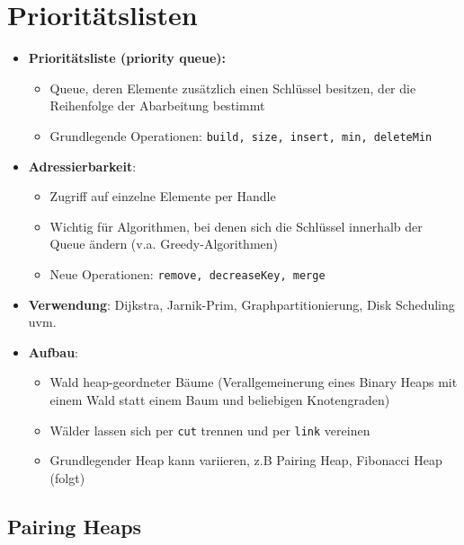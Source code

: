 \section{Prioritätslisten}%
\label{pl:sec:prioritaetslisten}

\begin{itemize}
	\item \textbf{Prioritätsliste (priority queue):}
	\begin{itemize}
		\item Queue, deren Elemente zusätzlich einen Schlüssel besitzen, der die Reihenfolge der Abarbeitung bestimmt
		\item Grundlegende Operationen: \texttt{build, size, insert, min, deleteMin}
	\end{itemize}
	\item \textbf{Adressierbarkeit}:
	\begin{itemize}
		\item Zugriff auf einzelne Elemente per Handle
		\item Wichtig für Algorithmen, bei denen sich die Schlüssel innerhalb der Queue ändern (v.a. Greedy-Algorithmen)
		\item Neue Operationen: \texttt{remove, decreaseKey, merge}
	\end{itemize}
	\item \textbf{Verwendung}: Dijkstra, Jarnik-Prim, Graphpartitionierung, Disk Scheduling uvm.
	\item \textbf{Aufbau}:
	\begin{itemize}
		\item Wald heap-geordneter Bäume (Verallgemeinerung eines Binary Heaps mit einem Wald statt einem Baum und beliebigen Knotengraden)
		\item Wälder lassen sich per \texttt{cut} trennen und per \texttt{link} vereinen
		\item Grundlegender Heap kann variieren, z.B Pairing Heap, Fibonacci Heap (folgt)
	\end{itemize}
	\end{itemize}

	\subsection{Pairing Heaps}%
	\label{pl:sub:pairing_heaps}

